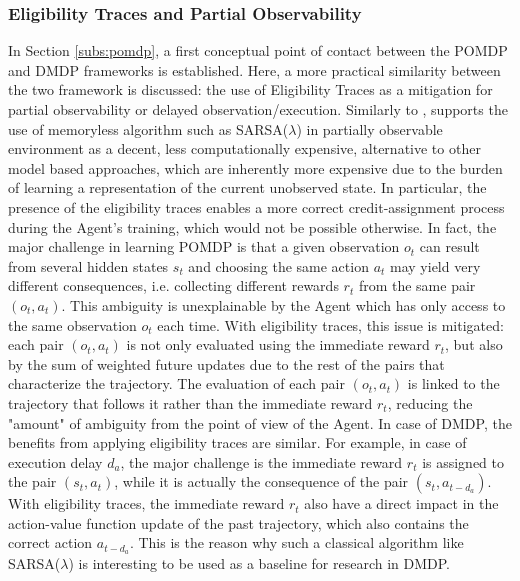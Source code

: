             \subsubsection{Eligibility Traces and Partial Observability}
                In Section \ref{subs:pomdp}, a first conceptual point of contact between the POMDP and DMDP frameworks is established. Here, a more practical similarity between the two framework is discussed: the use of Eligibility Traces as a mitigation for partial observability or delayed observation/execution. \newline
                Similarly to ,  supports the use of memoryless algorithm such as SARSA($\lambda$) in partially observable environment as a decent, less computationally expensive, alternative to other model based approaches, which are inherently more expensive due to the burden of learning a representation of the current unobserved state. In particular, the presence of the eligibility traces enables a more correct credit-assignment process during the Agent's training, which would not be possible otherwise. In fact, the major challenge in learning POMDP is that a given observation $o_t$ can result from several hidden states $s_t$ and choosing the same action $a_t$ may yield very different consequences, i.e. collecting different rewards $r_t$ from the same pair $(o_t, a_t)$. This ambiguity is unexplainable by the Agent which has only access to the same observation $o_t$ each time. With eligibility traces, this issue is mitigated: each pair $(o_t, a_t)$ is not only evaluated using the immediate reward $r_t$, but also by the sum of weighted future updates due to the rest of the pairs that characterize the trajectory. The evaluation of each pair $(o_t, a_t)$ is linked to the trajectory that follows it rather than the immediate reward $r_t$, reducing the "amount" of ambiguity from the point of view of the Agent. \newline
                In case of DMDP, the benefits from applying eligibility traces are similar. For example, in case of execution delay $d_a$, the major challenge is the immediate reward $r_t$ is assigned to the pair $(s_t, a_t)$, while it is actually the consequence of the pair $(s_t, a_{t-d_a})$. With eligibility traces, the immediate reward $r_t$ also have a direct impact in the action-value function update of the past trajectory, which also contains the correct action $a_{t-d_a}$. This is the reason why such a classical algorithm like SARSA($\lambda$) is interesting to be used as a baseline for research in DMDP.
        
